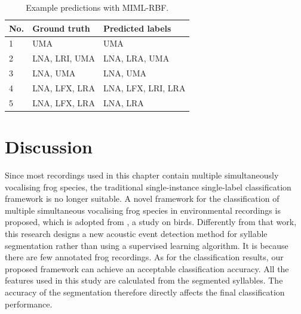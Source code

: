 \begin{table}[htb!]
\centering
\caption{Example predictions with MIML-RBF.}
\label{tab:prediction}
\begin{tabular}{lll}
\hline\hline
{\bf No.} &{\bf Ground truth} & {\bf Predicted labels} \\ \hline
1&UMA                & UMA                    \\ 
2&LNA, LRI, UMA      & LNA, LRA, UMA          \\ 
3&LNA, UMA           & LNA, UMA               \\ 
4&LNA, LFX, LRA      & LNA, LFX, LRI, LRA     \\ 
5&LNA, LFX, LRA      & LNA, LRA               \\ \hline\hline
\end{tabular}
\end{table}



\section{Discussion}
Since most recordings used in this chapter contain multiple simultaneously vocalising frog species, the traditional single-instance single-label classification framework is no longer suitable. A novel framework for the classification of multiple simultaneous vocalising frog species in environmental recordings is proposed, which is adopted from \citep{briggs2012acoustic}, a study on birds. Differently from that work, this research designs a new acoustic event detection method for syllable segmentation rather than using a supervised learning algorithm. It is because there are few annotated frog recordings. As for the classification results, our proposed framework can achieve an acceptable classification accuracy. All the features used in this study are calculated from the segmented syllables. The accuracy of the segmentation therefore directly affects the final classification performance.


